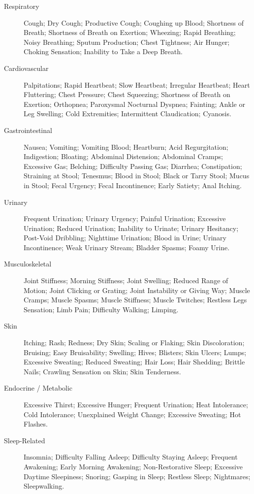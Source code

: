 \begin{description}
\item[Respiratory] Cough; Dry Cough; Productive Cough; Coughing up Blood; Shortness of Breath; Shortness of Breath on Exertion; Wheezing; Rapid Breathing; Noisy Breathing; Sputum Production; Chest Tightness; Air Hunger; Choking Sensation; Inability to Take a Deep Breath.

\item[Cardiovascular] Palpitations; Rapid Heartbeat; Slow Heartbeat; Irregular Heartbeat; Heart Fluttering; Chest Pressure; Chest Squeezing; Shortness of Breath on Exertion; Orthopnea; Paroxysmal Nocturnal Dyspnea; Fainting; Ankle or Leg Swelling; Cold Extremities; Intermittent Claudication; Cyanosis.

\item[Gastrointestinal] Nausea; Vomiting; Vomiting Blood; Heartburn; Acid Regurgitation; Indigestion; Bloating; Abdominal Distension; Abdominal Cramps; Excessive Gas; Belching; Difficulty Passing Gas; Diarrhea; Constipation; Straining at Stool; Tenesmus; Blood in Stool; Black or Tarry Stool; Mucus in Stool; Fecal Urgency; Fecal Incontinence; Early Satiety; Anal Itching.

\item[Urinary] Frequent Urination; Urinary Urgency; Painful Urination; Excessive Urination; Reduced Urination; Inability to Urinate; Urinary Hesitancy; Post-Void Dribbling; Nighttime Urination; Blood in Urine; Urinary Incontinence; Weak Urinary Stream; Bladder Spasms; Foamy Urine.

\item[Musculoskeletal] Joint Stiffness; Morning Stiffness; Joint Swelling; Reduced Range of Motion; Joint Clicking or Grating; Joint Instability or Giving Way; Muscle Cramps; Muscle Spasms; Muscle Stiffness; Muscle Twitches; Restless Legs Sensation; Limb Pain; Difficulty Walking; Limping.

\item[Skin] Itching; Rash; Redness; Dry Skin; Scaling or Flaking; Skin Discoloration; Bruising; Easy Bruisability; Swelling; Hives; Blisters; Skin Ulcers; Lumps; Excessive Sweating; Reduced Sweating; Hair Loss; Hair Shedding; Brittle Nails; Crawling Sensation on Skin; Skin Tenderness.

\item[Endocrine / Metabolic] Excessive Thirst; Excessive Hunger; Frequent Urination; Heat Intolerance; Cold Intolerance; Unexplained Weight Change; Excessive Sweating; Hot Flashes.

\item[Sleep-Related] Insomnia; Difficulty Falling Asleep; Difficulty Staying Asleep; Frequent Awakening; Early Morning Awakening; Non-Restorative Sleep; Excessive Daytime Sleepiness; Snoring; Gasping in Sleep; Restless Sleep; Nightmares; Sleepwalking.


\end{description}
